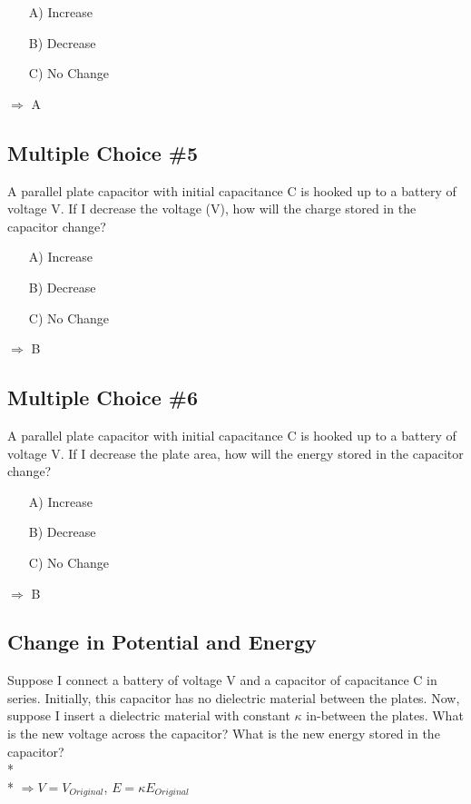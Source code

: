 \documentclass[11pt]{article}
\begin{document}
\begin{itemize}
\item[A)] Increase
\item[B)] Decrease
\item[C)] No Change
\end{itemize}
$\Rightarrow$ A

\pagebreak
\subsection{Multiple Choice \#5}
A parallel plate capacitor with initial capacitance C is hooked up to a battery of voltage V.  If I decrease the voltage (V), how will the charge stored in the capacitor change?

\begin{itemize}
\item[A)] Increase
\item[B)] Decrease
\item[C)] No Change
\end{itemize}
$\Rightarrow$ B

\subsection{Multiple Choice \#6}
A parallel plate capacitor with initial capacitance C is hooked up to a battery of voltage V.  If I decrease the plate area, how will the energy stored in the capacitor change?

\begin{itemize}
\item[A)] Increase
\item[B)] Decrease
\item[C)] No Change
\end{itemize}
$\Rightarrow$ B

\subsection{Change in Potential and Energy}
Suppose I connect a battery of voltage V and a capacitor of capacitance C in series.  Initially, this capacitor has no dielectric material between the plates.  Now, suppose I insert a dielectric material with constant $\kappa$ in-between the plates.  What is the new voltage across the capacitor?  What is the new energy stored in the capacitor? \\* \\*
$\Rightarrow V = V_{Original}$, \hspace{2mm}$E = \kappa E_{Original}$ 

\end{document}
